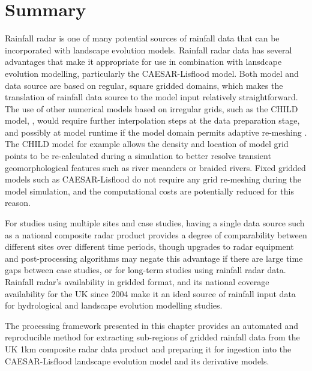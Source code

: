 \section{Summary}
Rainfall radar is one of many potential sources of rainfall data that can be incorporated with landscape evolution models. Rainfall radar data has several advantages that make it appropriate for use in combination with lansdcape evolution modelling, particularly the CAESAR-Lisflood model. Both model and data source are based on regular, square gridded domains, which makes the translation of rainfall data source to the model input relatively straightforward. The use of other numerical models based on irregular grids, such as the CHILD model,  \citep{Tucker2001}, would require further interpolation steps at the data preparation stage, and possibly at model runtime if the model domain permits adaptive re-meshing \citep{clevis2006simple, tucker2001child}. The CHILD model for example allows the density and location of model grid points to be re-calculated during a simulation to better resolve transient geomorphological features such as river meanders or braided rivers. Fixed gridded models such as CAESAR-Lisflood do not require any grid re-meshing during the model simulation, and the computational costs are potentially reduced for this reason.

For studies using multiple sites and case studies, having a single data source such as a national composite radar product provides a degree of comparability between different sites over different time periods, though upgrades to radar equipment and post-processing algorithms \citep[e.g.][]{harrison2012radar} may negate this advantage if there are large time gaps between case studies, or for long-term studies using rainfall radar data. Rainfall radar's availability in gridded format, and its national coverage availability for the UK since 2004 make it an ideal source of rainfall input data for hydrological and landscape evolution modelling studies. 

The processing framework presented in this chapter provides an automated and reproducible method for extracting sub-regions of gridded rainfall data from the UK 1km composite radar data product and preparing it for ingestion into the CAESAR-Lisflood landscape evolution model and its derivative models.


